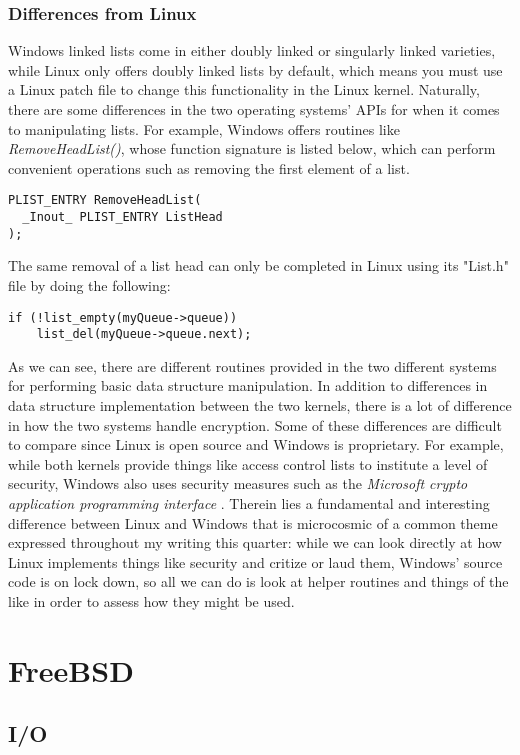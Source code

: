 \documentclass[letterpaper,10pt,titlepage]{article}
\begin{document}
\subsubsection{Differences from Linux}
Windows linked lists come in either doubly linked or singularly linked varieties, while Linux only offers doubly linked lists by default, which means you must use a Linux patch file to change this functionality in the Linux kernel. Naturally, there are some differences in the two operating systems' APIs for when it comes to manipulating lists. For example, Windows offers routines like \emph{RemoveHeadList()}, whose function signature is listed below, which can perform convenient operations such as removing the first element of a list. 
\begin{lstlisting}
PLIST_ENTRY RemoveHeadList(
  _Inout_ PLIST_ENTRY ListHead
);
\end{lstlisting}
The same removal of a list head can only be completed in Linux using its "List.h" file by doing the following:
\begin{lstlisting}
if (!list_empty(myQueue->queue))
    list_del(myQueue->queue.next);
\end{lstlisting}
As we can see, there are different routines provided in the two different systems for performing basic data structure manipulation. In addition to differences in data structure implementation between the two kernels, there is a lot of difference in how the two systems handle encryption. Some of these differences are difficult to compare since Linux is open source and Windows is proprietary. For example, while both kernels provide things like access control lists to institute a level of security, Windows also uses security measures such as the \emph{Microsoft crypto application programming interface} \cite{windowsSys}. Therein lies a fundamental and interesting difference between Linux and Windows that is microcosmic of a common theme expressed throughout my writing this quarter: while we can look directly at how Linux implements things like security and critize or laud them, Windows' source code is on lock down, so all we can do is look at helper routines and things of the like in order to assess how they might be used.  

\section{FreeBSD}
\subsection{I/O}
\end{document}
